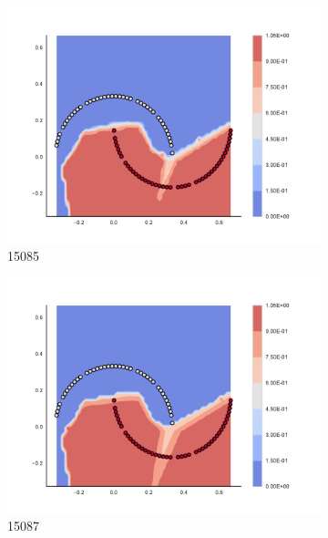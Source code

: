 \begin{figure}[h]
\begin{subfigure}[b]{0.09\textwidth}
    \includegraphics[clip, trim=2.35cm 1.75cm 4.5cm 0cm,width=\textwidth]{img/convergence/15085.pdf}
    \caption{15085}
    \label{fig:convergence_15085}
\end{subfigure}
%
\begin{subfigure}[b]{0.09\textwidth}
    \includegraphics[clip, trim=2.35cm 1.75cm 4.5cm 0cm,width=\textwidth]{img/convergence/15087.pdf}
    \caption{15087}
    \label{fig:convergence_15087}
\end{subfigure}
%
\begin{subfigure}[b]{0.09\textwidth}

\end{subfigure}
\end{figure}
